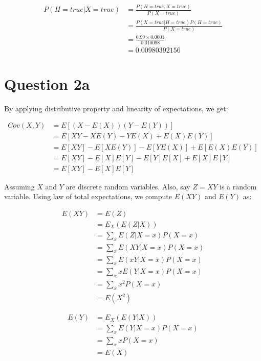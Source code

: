 \documentclass{article}
\begin{document}
    \begin{align*}
        P(H=true | X=true)  &= \frac{P(H=true, X=true)}{P(X=true)} \\
                            &= \frac{P(X=true | H=true) P(H=true)}{P(X=true)} \\
                            &= \frac{0.99 \times 0.0001}{0.010098} \\
                            &= 0.00980392156
    \end{align*}

    \section*{Question 2a}
    By applying distributive property and linearity of expectations, we get:

    \begin{align*}
        Cov(X, Y)   &= E[(X-E(X))(Y-E(Y))] \\
                    &= E[XY - XE(Y) - YE(X) + E(X)E(Y)] \\
                    &= E[XY] - E[XE(Y)] - E[YE(X)] + E[E(X)E(Y)] \\
                    &= E[XY] - E[X]E[Y] - E[Y]E[X] + E[X]E[Y] \\
                    &= E[XY] - E[X]E[Y]
    \end{align*}

    Assuming $X$ and $Y$ are discrete random variables. Also, say $Z = XY$ is a random variable. Using law of total expectations, we compute $E(XY)$ and $E(Y)$ as:

    \begin{align*}
        E(XY)   &= E(Z) \\
                &= E_{X}(E(Z|X)) \\
                &= \sum_{x} E(Z|X=x) P(X=x) \\
                &= \sum_{x} E(XY|X=x) P(X=x) \\
                &= \sum_{x} E(xY|X=x) P(X=x) \\
                &= \sum_{x} x E(Y|X=x) P(X=x) \\
                &= \sum_{x} x^{2} P(X=x) \\
                &= E(X^{2})
    \end{align*}

    \begin{align*}
        E(Y)    &= E_{X}(E(Y|X)) \\
                &= \sum_{x} E(Y|X=x) P(X=x) \\
                &= \sum_{x} x P(X=x) \\
                &= E(X)
    \end{align*}
\end{document}
